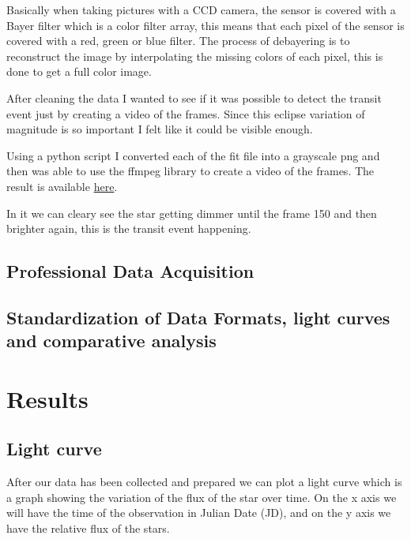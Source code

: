 \documentclass[12pt,a4paper]{article}
\begin{document}
\bigskip

Basically when taking pictures with a CCD camera, the sensor is covered with a Bayer filter which is a color filter array, this means that each pixel of the sensor is covered with a red, green or blue filter.
The process of debayering is to reconstruct the image by interpolating the missing colors of each pixel, this is done to get a full color image.

\medskip

After cleaning the data I wanted to see if it was possible to detect the transit event just by creating a video of the frames.
Since this eclipse variation of magnitude is so important I felt like it could be visible enough.

\bigskip

Using a python script I converted each of the fit file into a grayscale png and then was able to use the ffmpeg library to create a video of the frames.
The result is available \href{https://youtube.com/shorts/rVnEccCb3Aw}{here}.

In it we can cleary see the star getting dimmer until the frame 150 and then brighter again, this is the transit event happening.

\subsection{Professional Data Acquisition}

\subsection{Standardization of Data Formats, light curves and comparative analysis}

\section{Results}

\subsection{Light curve}

After our data has been collected and prepared we can plot a light curve which is a graph showing the variation of the flux of the star over time.
On the x axis we will have the time of the observation in Julian Date (JD), and on the y axis we have the relative flux of the stars.
\end{document}
